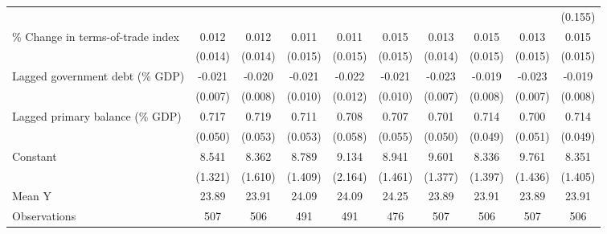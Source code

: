 {\begin{tabular}{l*{9}{c}}
                    &                     &                     &                     &                     &                     &                     &                     &                     &     (0.155)         \\
\addlinespace
\% Change in terms-of-trade index&       0.012         &       0.012         &       0.011         &       0.011         &       0.015         &       0.013         &       0.015         &       0.013         &       0.015         \\
                    &     (0.014)         &     (0.014)         &     (0.015)         &     (0.015)         &     (0.015)         &     (0.014)         &     (0.015)         &     (0.015)         &     (0.015)         \\
\addlinespace
Lagged government debt (\% GDP)&      -0.021\sym{***}&      -0.020\sym{**} &      -0.021\sym{**} &      -0.022\sym{*}  &      -0.021\sym{**} &      -0.023\sym{***}&      -0.019\sym{**} &      -0.023\sym{***}&      -0.019\sym{**} \\
                    &     (0.007)         &     (0.008)         &     (0.010)         &     (0.012)         &     (0.010)         &     (0.007)         &     (0.008)         &     (0.007)         &     (0.008)         \\
\addlinespace
Lagged primary balance (\% GDP)&       0.717\sym{***}&       0.719\sym{***}&       0.711\sym{***}&       0.708\sym{***}&       0.707\sym{***}&       0.701\sym{***}&       0.714\sym{***}&       0.700\sym{***}&       0.714\sym{***}\\
                    &     (0.050)         &     (0.053)         &     (0.053)         &     (0.058)         &     (0.055)         &     (0.050)         &     (0.049)         &     (0.051)         &     (0.049)         \\
\addlinespace
Constant            &       8.541\sym{***}&       8.362\sym{***}&       8.789\sym{***}&       9.134\sym{***}&       8.941\sym{***}&       9.601\sym{***}&       8.336\sym{***}&       9.761\sym{***}&       8.351\sym{***}\\
                    &     (1.321)         &     (1.610)         &     (1.409)         &     (2.164)         &     (1.461)         &     (1.377)         &     (1.397)         &     (1.436)         &     (1.405)         \\
\midrule
Mean Y              &       23.89         &       23.91         &       24.09         &       24.09         &       24.25         &       23.89         &       23.91         &       23.89         &       23.91         \\
Observations        &         507         &         506         &         491         &         491         &         476         &         507         &         506         &         507         &         506         \\
\bottomrule
\end{tabular}
}
